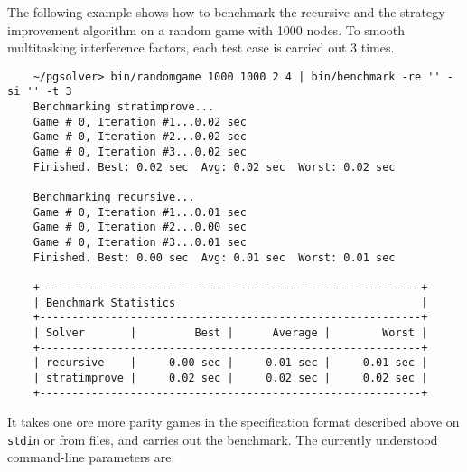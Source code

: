 \begin{example}
The following example shows how to benchmark the recursive and the strategy improvement algorithm on a 
random game with 1000 nodes. To smooth multitasking interference factors, each test case is carried out 
3 times.
\begin{verbatim}
    ~/pgsolver> bin/randomgame 1000 1000 2 4 | bin/benchmark -re '' -si '' -t 3
    Benchmarking stratimprove...
    Game # 0, Iteration #1...0.02 sec
    Game # 0, Iteration #2...0.02 sec
    Game # 0, Iteration #3...0.02 sec
    Finished. Best: 0.02 sec  Avg: 0.02 sec  Worst: 0.02 sec

    Benchmarking recursive...
    Game # 0, Iteration #1...0.01 sec
    Game # 0, Iteration #2...0.00 sec
    Game # 0, Iteration #3...0.01 sec
    Finished. Best: 0.00 sec  Avg: 0.01 sec  Worst: 0.01 sec

    +-----------------------------------------------------------+
    | Benchmark Statistics                                      |
    +-----------------------------------------------------------+
    | Solver       |         Best |      Average |        Worst |
    +-----------------------------------------------------------+
    | recursive    |     0.00 sec |     0.01 sec |     0.01 sec |
    | stratimprove |     0.02 sec |     0.02 sec |     0.02 sec |
    +-----------------------------------------------------------+
\end{verbatim}
\end{example}

It takes one ore more parity games in the specification format described above on \texttt{stdin} or
from files, and carries out the benchmark. The currently understood command-line parameters are:

